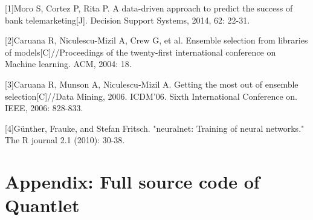 \documentclass[12pt, a4paper, bibliography=totoc, english]{scrartcl}
\begin{document}
\clearpage

\begin{center}
\end{center}

[1]Moro S, Cortez P, Rita P. A data-driven approach to predict the success of bank telemarketing[J]. Decision Support Systems, 2014, 62: 22-31.

[2]Caruana R, Niculescu-Mizil A, Crew G, et al. Ensemble selection from libraries of models[C]//Proceedings of the twenty-first international conference on Machine learning. ACM, 2004: 18.

[3]Caruana R, Munson A, Niculescu-Mizil A. Getting the most out of ensemble selection[C]//Data Mining, 2006. ICDM'06. Sixth International Conference on. IEEE, 2006: 828-833.

[4]Günther, Frauke, and Stefan Fritsch. "neuralnet: Training of neural networks." The R journal 2.1 (2010): 30-38.

\clearpage

\appendix
\section{Appendix: Full source code of Quantlet}
\end{document}
